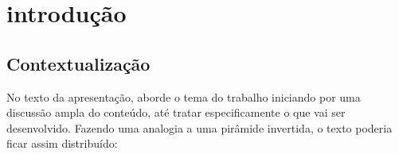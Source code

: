 \documentclass[pnumromarab, normaltoc, a4paper, 12pt]{abnt-unochapeco}
\begin{document}
\newcommand{\area}{área de ciências exatas e ambientais}
\newcommand{\curso}{ciência da computação}
\newcommand{\grau}{bacharelado}
\newcommand{\grautitulo}{bacharel}
\newcommand{\supervisortcc}{Prof. Fulano da Silva, Esp.,MSc., Dr.}
\newcommand{\coordenador}{Prof. Outro Fulano, Esp.,MSc., Dr.}
\newcommand{\membrobancaa}{Prof. Fulano da Silva, Esp.,MSc., Dr.}
\newcommand{\membrobancab}{Prof. Outro Fulano, Esp.,MSc., Dr.}
\newcommand{\datadefesa}{Dia de Mês de Ano (data da defesa)}

\renewcommand{\autor}{nome completo do aluno}
\renewcommand{\instituicao}{universidade comunitária da região de chapecó}
\renewcommand{\titulo}{título do trabalho de conclusão do curso}
\renewcommand{\local}{Chapecó}
\renewcommand{\data}{mês (extenso) de ano (4 dígitos)}
\renewcommand{\comentario}{Relatório do Trabalho de Conclusão de Curso submetido
  à Universidade \mbox{Comunitária} da Região de Chapecó para obtenção do título
  de bacharelado no curso de Ciência da Computação.}
\renewcommand{\orientador}{Prof(a). Nome do(a) orientador(a)}
\renewcommand{\coorientador}{Prof(a). Nome do(a) co-orientador(a)}

\capa
\folhaderosto
\folhadeaprovacao







\listadesiglas

\listoffigures

\listoftables

\renewcommand{\contentsname}%
  {\vspace*{.8cm}
  \normalsize{\bfseries\MakeUppercase{sumário}}%
  \vspace{1.4cm}}

\sumario

\chapter{introdução}
\section{Contextualização}
No texto da apresentação, aborde o tema do trabalho iniciando por uma discussão
ampla do conteúdo, até tratar especificamente o que vai ser desenvolvido.
Fazendo uma analogia a uma pirâmide invertida, o texto poderia ficar assim
distribuído:
\end{document}
